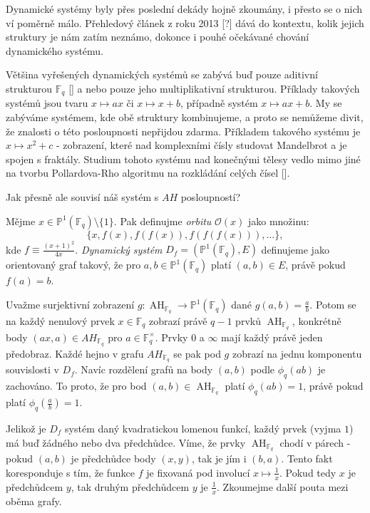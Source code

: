 \documentclass[12pt]{report}
\DeclareMathOperator{\AH}{AH}
\begin{document}
Dynamické systémy byly přes poslední dekády hojně zkoumány, i přesto se o nich ví poměrně málo. Přehledový článek z roku 2013 [?] dává do kontextu, kolik jejich struktury je nám zatím neznámo, dokonce i pouhé očekávané chování dynamického systému. 

Většina vyřešených dynamických systémů se zabývá buď pouze aditivní strukturou $\mathbb{F}_q$ [] a nebo pouze jeho multiplikativní strukturou. Příklady takových systémů jsou tvaru $x \longmapsto ax$ či $x \longmapsto x+b$, případně systém $x \longmapsto ax+b$. My se zabýváme systémem, kde obě struktury kombinujeme, a proto se nemůžeme divit, že znalosti o této posloupnosti nepřijdou zdarma. Příkladem takového systému je $x \longmapsto x^2+c$ - zobrazení, které nad komplexními čísly studovat Mandelbrot a je spojen s fraktály. Studium tohoto systému nad konečnými tělesy vedlo mimo jiné na tvorbu Pollardova-Rho algoritmu na rozkládání celých čísel [].

Jak přesně ale souvisí náš systém s $AH$ posloupností? 

\begin{definice}
Mějme $x \in \mathbb{P}^{1}(\mathbb{F}_q) \setminus \lbrace 1 \rbrace$. Pak definujme \textit{orbitu} $\mathcal{O}(x)$ jako množinu:
$$\lbrace x,f(x),f(f(x)),f(f(f(x))),\dots \rbrace,$$
kde $f \equiv \frac{(x+1)^2}{4x}$. \textit{Dynamický systém} $D_f = (\mathbb{P}^{1}(\mathbb{F}_q),E)$ definujeme jako orientovaný graf takový, že pro $a,b \in \mathbb{P}^{1}(\mathbb{F}_q)$ platí $(a,b) \in E$, právě pokud $f(a)=b$.
\end{definice}

Uvažme surjektivní zobrazení $g : \AH_{\mathbb{F}_q} \longrightarrow \mathbb{P}^1 (\mathbb{F}_q)$ dané $g(a,b) = \frac{a}{b}$. Potom se na každý nenulový prvek $x \in \mathbb{F}_q$ zobrazí právě $q-1$ prvků $\AH_{\mathbb{F}_q}$, konkrétně body $(ax,a) \in AH_{\mathbb{F}_q}$ pro $a \in \mathbb{F}_q ^{\times}$. Prvky $0$ a $\infty$ mají každý právě jeden předobraz. Každé hejno v grafu $AH_{\mathbb{F}_q}$ se pak pod $g$ zobrazí na jednu komponentu souvislosti v $D_f$. Navíc rozdělení grafů na body $(a,b)$ podle $\phi_q(ab)$ je zachováno. To proto, že pro bod $(a,b) \in \AH_{\mathbb{F}_q}$ platí $\phi_q(ab) =1$, právě pokud platí $\phi_q \left(\frac{a}{b} \right) = 1$.

Jelikož je $D_f$ systém daný kvadratickou lomenou funkcí, každý prvek (vyjma $1$) má buď žádného nebo dva předchůdce. Víme, že prvky $\AH_{\mathbb{F}_q}$ chodí v párech - pokud $(a,b)$ je předchůdce body $(x,y)$, tak je jím i $(b,a)$. Tento fakt koresponduje s tím, že funkce $f$ je fixovaná pod involucí $x \longmapsto \frac{1}{x}$. Pokud tedy $x$ je předchůdcem $y$, tak druhým předchůdcem $y$ je $\frac{1}{x}$. Zkoumejme další pouta mezi oběma grafy.
\end{document}
